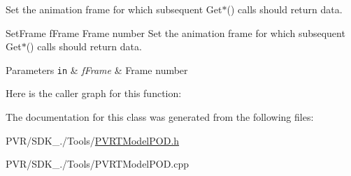 Set the animation frame for which subsequent Get$\ast$() calls should return data. 



  Set\+Frame  f\+Frame Frame number  Set the animation frame for which subsequent Get$\ast$() calls should return data.






\begin{DoxyParams}[1]{Parameters}
\mbox{\tt in}  & {\em f\+Frame} & Frame number \\
\hline
\end{DoxyParams}


Here is the caller graph for this function\+:




The documentation for this class was generated from the following files\+:\begin{DoxyCompactItemize}
\item 
P\+V\+R/\+S\+D\+K\+\_./\+Tools/\hyperlink{_p_v_r_t_model_p_o_d_8h}{P\+V\+R\+T\+Model\+P\+O\+D.\+h}\item 
P\+V\+R/\+S\+D\+K\+\_./\+Tools/P\+V\+R\+T\+Model\+P\+O\+D.\+cpp\end{DoxyCompactItemize}
